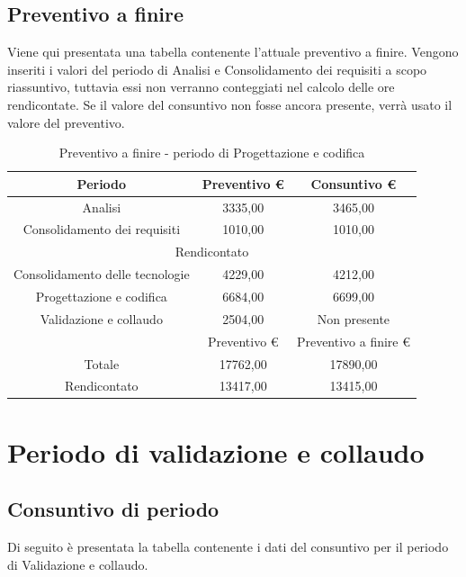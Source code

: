 \documentclass[./PianodiProgetto.tex]{subfiles}
\begin{document}
\subsection{Preventivo a finire}
Viene qui presentata una tabella contenente l'attuale preventivo a finire.
Vengono inseriti i valori del periodo di Analisi e Consolidamento dei requisiti a scopo riassuntivo, tuttavia essi non verranno conteggiati nel calcolo delle ore rendicontate. Se il valore del consuntivo non fosse ancora presente, verrà usato il valore del preventivo.

\begin{table}[H]
	\centering
	\begin{tabular}{|c|c|c|}
		\hline
		Periodo&Preventivo \euro{}&Consuntivo \euro{} \\ \hline
		Analisi&3335,00&3465,00  \\ \hline
		Consolidamento dei requisiti&1010,00&1010,00  \\ \hline
		\multicolumn{3}{|c|}{Rendicontato}  \\ \hline
		Consolidamento delle tecnologie&4229,00&4212,00  \\ \hline
		Progettazione e codifica&6684,00&6699,00  \\ \hline
		Validazione e collaudo&2504,00&Non presente  \\ \hline
		&Preventivo \euro{}&Preventivo a finire \euro{}  \\ \hline
		Totale&17762,00&17890,00 \\ \hline
		Rendicontato&13417,00&13415,00 \\ \hline
	\end{tabular}
	\caption{Preventivo a finire - periodo di Progettazione e codifica}
\end{table}

\section{Periodo di validazione e collaudo}
\subsection{Consuntivo di periodo}
Di seguito è presentata la tabella contenente i dati del consuntivo per il periodo di Validazione e collaudo.
\end{document}

